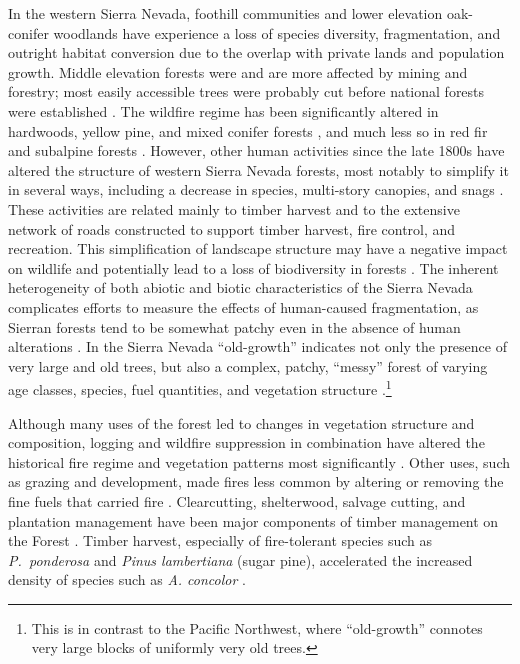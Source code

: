In the western Sierra Nevada, foothill communities and lower elevation oak-conifer woodlands have experience a loss of species diversity, fragmentation, and outright habitat conversion due to the overlap with private lands and population growth. Middle elevation forests were and are more affected by mining and forestry; most easily accessible trees were probably cut before national forests were established \citep{SNEP1996}. The wildfire regime has been significantly altered in hardwoods, yellow pine, and mixed conifer forests \citep{Merriam2013,Safford2013}, and much less so in red fir and subalpine forests \citep{Meyer2013,Meyer2013a}. However, other human activities since the late 1800s have altered the structure of western Sierra Nevada forests, most notably to simplify it in several ways, including a decrease in species, multi-story canopies, and snags \citep{SNEP1996}. These activities are related mainly to timber harvest and to the extensive network of roads constructed to support timber harvest, fire control, and recreation. This simplification of landscape structure may have a negative impact on wildlife and potentially lead to a loss of biodiversity in forests \citep{Thompson2003,Manley2004,Hunter2011}. The inherent heterogeneity of both abiotic and biotic characteristics of the Sierra Nevada complicates efforts to measure the effects of human-caused fragmentation, as Sierran forests tend to be somewhat patchy even in the absence of human alterations \citep{Franklin1996}. In the Sierra Nevada ``old-growth'' indicates not only the presence of very large and old trees, but also a complex, patchy, ``messy'' forest of varying age classes, species, fuel quantities, and vegetation structure \citep{SNEP1996}.\footnote{This is in contrast to the Pacific Northwest, where ``old-growth'' connotes very large blocks of uniformly very old trees. }

Although many uses of the forest led to changes in vegetation structure and composition, logging and wildfire suppression in combination have altered the historical fire regime and vegetation patterns most significantly \citep{Storer1963,Hessburg2005,Knapp2013,Stephens2015}. Other uses, such as grazing and development, made fires less common by altering or removing the fine fuels that carried fire \citep{Hessburg2005}. Clearcutting, shelterwood, salvage cutting, and plantation management have been major components of timber management on the Forest \citep{USDAForestService2014}. Timber harvest, especially of fire-tolerant species such as \emph{P.~ponderosa} and \emph{Pinus lambertiana} (sugar pine), accelerated the increased density of species such as \emph{A. concolor} \citep{Hessburg2005}. 

